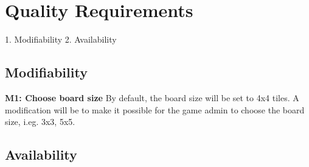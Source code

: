 \section{Quality Requirements}

1. Modifiability
2. Availability

\subsection{Modifiability}

{\bf M1: Choose board size}
By default, the board size will be set to 4x4 tiles. 
A modification will be to make it possible for the game admin to choose the board size, i.eg. 3x3, 5x5. 




\subsection{Availability}

